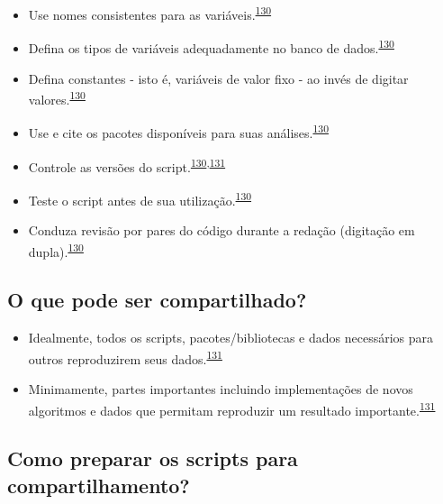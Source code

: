 \documentclass[
]{book}
\begin{document}
\begin{itemize}
\item
  Use nomes consistentes para as variáveis.\textsuperscript{\protect\hyperlink{ref-SchwabSimon2021}{130}}
\item
  Defina os tipos de variáveis adequadamente no banco de dados.\textsuperscript{\protect\hyperlink{ref-SchwabSimon2021}{130}}
\item
  Defina constantes - isto é, variáveis de valor fixo - ao invés de digitar valores.\textsuperscript{\protect\hyperlink{ref-SchwabSimon2021}{130}}
\item
  Use e cite os pacotes disponíveis para suas análises.\textsuperscript{\protect\hyperlink{ref-SchwabSimon2021}{130}}
\item
  Controle as versões do script.\textsuperscript{\protect\hyperlink{ref-SchwabSimon2021}{130},\protect\hyperlink{ref-Eglen2017}{131}}
\item
  Teste o script antes de sua utilização.\textsuperscript{\protect\hyperlink{ref-SchwabSimon2021}{130}}
\item
  Conduza revisão por pares do código durante a redação (digitação em dupla).\textsuperscript{\protect\hyperlink{ref-SchwabSimon2021}{130}}
\end{itemize}

\hypertarget{o-que-pode-ser-compartilhado}{%
\subsection{O que pode ser compartilhado?}\label{o-que-pode-ser-compartilhado}}

\begin{itemize}
\item
  Idealmente, todos os scripts, pacotes/bibliotecas e dados necessários para outros reproduzirem seus dados.\textsuperscript{\protect\hyperlink{ref-Eglen2017}{131}}
\item
  Minimamente, partes importantes incluindo implementações de novos algoritmos e dados que permitam reproduzir um resultado importante.\textsuperscript{\protect\hyperlink{ref-Eglen2017}{131}}
\end{itemize}

\hypertarget{como-preparar-os-scripts-para-compartilhamento}{%
\subsection{Como preparar os scripts para compartilhamento?}\label{como-preparar-os-scripts-para-compartilhamento}}
\end{document}
